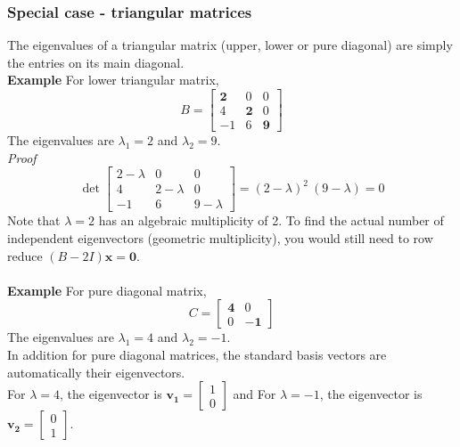 \documentclass[../linear-algebra.tex]{subfiles}
\begin{document}
\subsubsection{Special case - triangular matrices}
The eigenvalues of a triangular matrix (upper, lower or pure diagonal) are simply the entries on its main diagonal.\\
\textbf{Example} For lower triangular matrix,
$$B = \begin{bmatrix} \mathbf{2} & 0 & 0 \\ 4 & \mathbf{2} & 0 \\ -1 & 6 & \mathbf{9} \end{bmatrix}$$
The eigenvalues are $\lambda_1 = 2$ and $\lambda_2 = 9$.\\
\textit{Proof} $$ \det \begin{bmatrix} 2-\lambda & 0 & 0 \\ 4 & 2-\lambda & 0 \\ -1 & 6 & 9-\lambda \end{bmatrix} = (2-\lambda)^2\:(9-\lambda) = 0$$
Note that $\lambda = 2$ has an algebraic multiplicity of 2. To find the actual number of independent eigenvectors (geometric multiplicity), you would still need to row reduce $(B - 2I)\mathbf{x} = \mathbf{0}$.\\
\\
\textbf{Example} For pure diagonal matrix,
$$C = \begin{bmatrix} \mathbf{4} & 0 \\ 0 & \mathbf{-1} \end{bmatrix}$$
The eigenvalues are $\lambda_1 = 4$ and $\lambda_2 = -1$.\\
In addition for pure diagonal matrices, the standard basis vectors are automatically their eigenvectors.\\
For $\lambda = 4$, the eigenvector is $\mathbf{v_1} = \begin{bmatrix} 1 \\ 0 \end{bmatrix}$ and For $\lambda = -1$, the eigenvector is $\mathbf{v_2} = \begin{bmatrix} 0 \\ 1 \end{bmatrix}$.
\end{document}
